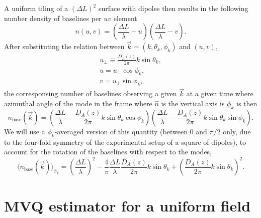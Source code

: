 \documentclass[12pt]{paper}
\newcommand{\beq}{\begin{equation}}
\newcommand{\eeq}{\end{equation}}
\newcommand{\bga}{\begin{gathered}}
\newcommand{\ega}{\end{gathered}}
\begin{document}
A uniform tiling of a $(\Delta L)^2$ surface with dipoles then results in the following number density of baselines per $uv$ element
\beq
n(u,v) = (\frac{\Delta L}{\lambda} - u)(\frac{\Delta L}{\lambda} - v).
\label{eq:nuv_fftt}
\eeq
After substituting the relation between $\vec k=(k,\theta_k,\phi_k)$ and $(u,v)$, 
\beq
\bga
u_\perp \equiv \frac{D_A(z)}{2\pi}k\sin\theta_k,\\
u = u_\perp \cos\phi_k,\\
v = u_\perp \sin\phi_k,
\ega
\label{eq:k_uv}
\eeq
the corresponsing number of baselines observing a given $\vec k$ at a given time where azimuthal angle of the mode in the frame where $\widehat n$ is the vertical axis is $\phi_k$ is then
\beq
n_\text{base}(\vec k) = (\frac{\Delta L}{\lambda} - \frac{D_A(z)}{2\pi}k\sin\theta_k\cos\phi_k)(\frac{\Delta L}{\lambda} - \frac{D_A(z)}{2\pi}k\sin\theta_k\sin\phi_k).
\label{eq:nk_fftt}
\eeq
We will use a $\phi_k$-averaged version of this quantity (between $0$ and $\pi/2$ only, due to the four-fold symmetry of the experimental setup of a square of dipoles), to account for the rotation of the baselines with respect to the modes,
\beq
\langle n_\text{base}(\vec k) \rangle_{\phi_k}= \left(\frac{\Delta L}{\lambda}\right)^2 -\frac{4}{\pi}\frac{\Delta L}{\lambda}\frac{D_A(z)}{2\pi}k\sin\theta_k + \left(\frac{D_A(z)}{2\pi}k\sin\theta_k\right)^2.
\label{eq:nk_fftt_mean}
\eeq
\section{MVQ estimator for a uniform field}
\label{sec:B_estimator}
\end{document}
